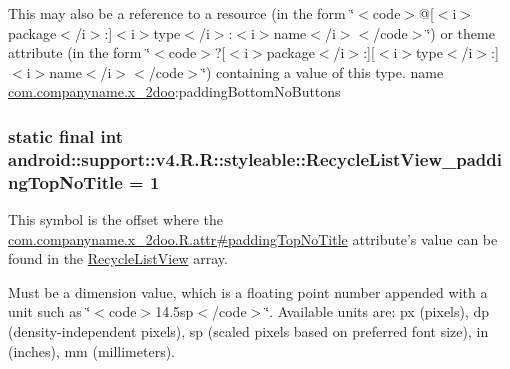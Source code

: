 This may also be a reference to a resource (in the form \char`\"{}$<$code$>$@\mbox{[}$<$i$>$package$<$/i$>$:\mbox{]}$<$i$>$type$<$/i$>$:$<$i$>$name$<$/i$>$$<$/code$>$\char`\"{}) or theme attribute (in the form \char`\"{}$<$code$>$?\mbox{[}$<$i$>$package$<$/i$>$:\mbox{]}\mbox{[}$<$i$>$type$<$/i$>$:\mbox{]}$<$i$>$name$<$/i$>$$<$/code$>$\char`\"{}) containing a value of this type.  name \hyperlink{namespacecom_1_1companyname_1_1x__2doo}{com.companyname.x\_\-2doo}:paddingBottomNoButtons \hypertarget{classandroid_1_1support_1_1v4_1_1_r_1_1styleable_f5dc6d14ce6c3162b12e614839fced9b}{
\subsubsection[{RecycleListView\_\-paddingTopNoTitle}]{\setlength{\rightskip}{0pt plus 5cm}static final int android::support::v4.R.R::styleable::RecycleListView\_\-paddingTopNoTitle = 1}}
\label{classandroid_1_1support_1_1v4_1_1_r_1_1styleable_f5dc6d14ce6c3162b12e614839fced9b}


This symbol is the offset where the \hyperlink{classcom_1_1companyname_1_1x__2doo_1_1_r_1_1attr_5cf782c12557be2430e7d3e353219950}{com.companyname.x\_\-2doo.R.attr\#paddingTopNoTitle} attribute's value can be found in the \hyperlink{classandroid_1_1support_1_1v4_1_1_r_1_1styleable_01daac6761518f23e42dc126a1955191}{RecycleListView} array.

Must be a dimension value, which is a floating point number appended with a unit such as \char`\"{}$<$code$>$14.5sp$<$/code$>$\char`\"{}. Available units are: px (pixels), dp (density-independent pixels), sp (scaled pixels based on preferred font size), in (inches), mm (millimeters). 

